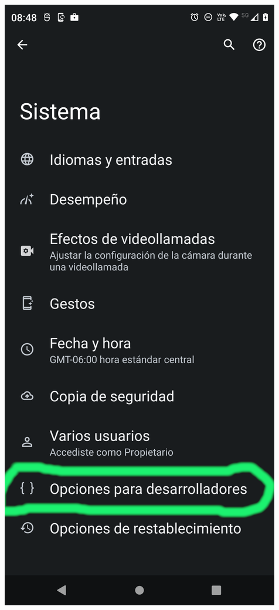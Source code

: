 \begin{frame}
\begin{columns}
\begin{center}
\end{center}
\begin{center}
\includegraphics[width=0.95\linewidth]{00_Configurar/ModoDesarrollador6.png}    

\end{center}
\end{columns}
\end{frame}
